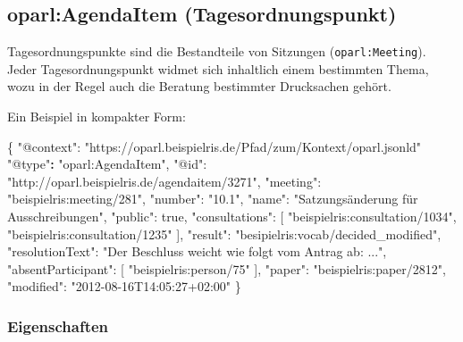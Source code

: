 \documentclass[,a4paper]{article}
\newenvironment{Shaded}{}{}
\newcommand{\DataTypeTok}[1]{\textcolor[rgb]{0.56,0.13,0.00}{{#1}}}
\newcommand{\DecValTok}[1]{\textcolor[rgb]{0.25,0.63,0.44}{{#1}}}
\newcommand{\StringTok}[1]{\textcolor[rgb]{0.25,0.44,0.63}{{#1}}}
\newcommand{\ErrorTok}[1]{\textcolor[rgb]{1.00,0.00,0.00}{\textbf{{#1}}}}
\newcommand{\NormalTok}[1]{{#1}}
\begin{document}
\subsection{oparl:AgendaItem
(Tagesordnungspunkt)}\label{oparlux5fagendaitem}

Tagesordnungspunkte sind die Bestandteile von Sitzungen
(\texttt{oparl:Meeting}). Jeder Tagesordnungspunkt widmet sich
inhaltlich einem bestimmten Thema, wozu in der Regel auch die Beratung
bestimmter Drucksachen gehört.

Ein Beispiel in kompakter Form:

\begin{Shaded}
\begin{Highlighting}[]
\NormalTok{\{}
    \DataTypeTok{"@context"}\NormalTok{: }\StringTok{"https://oparl.beispielris.de/Pfad/zum/Kontext/oparl.jsonld"}
    \StringTok{"@type"}\ErrorTok{:} \StringTok{"oparl:AgendaItem"}\NormalTok{,}
    \DataTypeTok{"@id"}\NormalTok{: }\StringTok{"http://oparl.beispielris.de/agendaitem/3271"}\NormalTok{,}
    \DataTypeTok{"meeting"}\NormalTok{: }\StringTok{"beispielris:meeting/281"}\NormalTok{,}
    \DataTypeTok{"number"}\NormalTok{: }\StringTok{"10.1"}\NormalTok{,}
    \DataTypeTok{"name"}\NormalTok{: }\StringTok{"Satzungsänderung für Ausschreibungen"}\NormalTok{,}
    \DataTypeTok{"public"}\NormalTok{: }\DecValTok{true}\NormalTok{,}
    \DataTypeTok{"consultations"}\NormalTok{: [}
        \StringTok{"beispielris:consultation/1034"}\NormalTok{,}
        \StringTok{"beispielris:consultation/1235"}
    \NormalTok{],}
    \DataTypeTok{"result"}\NormalTok{: }\StringTok{"besipielris:vocab/decided_modified"}\NormalTok{,}
    \DataTypeTok{"resolutionText"}\NormalTok{: }\StringTok{"Der Beschluss weicht wie folgt vom Antrag ab: ..."}\NormalTok{,}
    \DataTypeTok{"absentParticipant"}\NormalTok{: [}
        \StringTok{"beispielris:person/75"}
    \NormalTok{],}
    \DataTypeTok{"paper"}\NormalTok{: }\StringTok{"beispielris:paper/2812"}\NormalTok{,}
    \DataTypeTok{"modified"}\NormalTok{: }\StringTok{"2012-08-16T14:05:27+02:00"}
\NormalTok{\}}
\end{Highlighting}
\end{Shaded}

\subsubsection{Eigenschaften}\label{eigenschaften-5}
\end{document}
